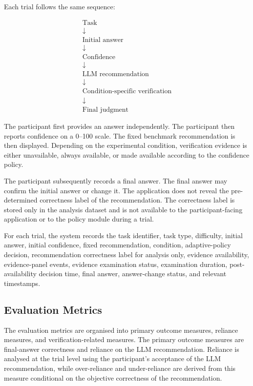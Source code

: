 \documentclass[oneside,final,14pt,a4paper]{extreport}
\begin{document}
Each trial follows the same sequence:

\[
\begin{array}{c}
\text{Task}\\
\downarrow\\
\text{Initial answer}\\
\downarrow\\
\text{Confidence}\\
\downarrow\\
\text{LLM recommendation}\\
\downarrow\\
\text{Condition-specific verification}\\
\downarrow\\
\text{Final judgment}
\end{array}
\]

The participant first provides an answer independently. The participant then
reports confidence on a 0--100 scale. The fixed benchmark recommendation is
then displayed. Depending on the experimental condition, verification evidence
is either unavailable, always available, or made available according to the
confidence policy.

The participant subsequently records a final answer. The final answer may
confirm the initial answer or change it. The application does not reveal the
pre-determined correctness label of the recommendation. The correctness label
is stored only in the analysis dataset and is not available to the
participant-facing application or to the policy module during a trial.

For each trial, the system records the task identifier, task type, difficulty,
initial answer, initial confidence, fixed recommendation, condition,
adaptive-policy decision, recommendation correctness label for analysis only,
evidence availability, evidence-panel events, evidence examination status,
examination duration, post-availability decision time, final answer,
answer-change status, and relevant timestamps.

\subsection{Evaluation Metrics}
\label{subsec:metrics}

The evaluation metrics are organised into primary outcome measures, reliance
measures, and verification-related measures. The primary outcome measures are
final-answer correctness and reliance on the LLM recommendation. Reliance is
analysed at the trial level using the participant's acceptance of the LLM
recommendation, while over-reliance and under-reliance are derived from this
measure conditional on the objective correctness of the recommendation.
\end{document}
